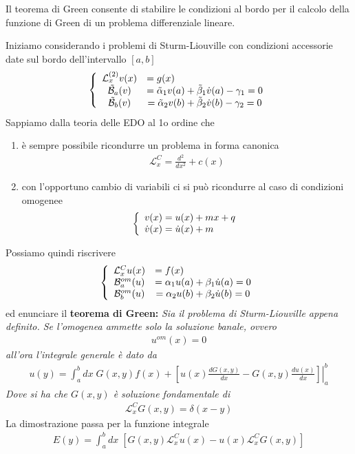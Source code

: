 Il teorema di Green consente di stabilire le condizioni al bordo per il calcolo della funzione di Green di un problema differenziale lineare.

Iniziamo considerando i problemi di Sturm-Liouville con condizioni accessorie date sul bordo dell'intervallo $[a,b]$
\begin{align}
	\triple{\mathcal{L}_x^{(2)} v(x) &= g(x) \hfill}{\mathcal{\tilde{B}}_a(v) &= \tilde{\alpha}_1 v(a) + \tilde{\beta}_1 \dot{v}(a) - \gamma_1 = 0}{\mathcal{\tilde{B}}_b(v) &= \tilde{\alpha}_2 v(b) + \tilde{\beta}_2 \dot{v}(b) - \gamma_2 = 0}
\end{align}
Sappiamo dalla teoria delle EDO al 1o ordine che 
\begin{enumerate}
	\item è sempre possibile ricondurre un problema in forma canonica
	\begin{align}
		\mathcal{L}_x^{C} = \frac{d^2}{dx^2} + c(x) \label{omcond3}
	\end{align} 
	\item con l'opportuno cambio di variabili ci si può ricondurre al caso di condizioni omogenee
		\begin{align}
			\double{v(x) = u(x)+ mx + q}{\dot{v}(x) = \dot{u}(x) +m \hfill}			
		\end{align}
\end{enumerate}
Possiamo quindi riscrivere
\begin{align}
	\triple{\mathcal{L}_x^{C} u(x) &= f(x) \hfill}{\mathcal{B}^{om}_a(u) &= \alpha_1 u(a) + \beta_1 \dot{u}(a) = 0}{\mathcal{B}^{om}_b(u) &= \alpha_2 u(b) + \beta_2 \dot{u}(b) = 0} \label{omcond1}
\end{align}
ed enunciare il \textbf{teorema di Green:} \textit{Sia il problema di Sturm-Liouville appena definito. Se l'omogenea ammette solo la soluzione banale, ovvero
\begin{align}
	u^{om}(x) = 0
\end{align}
all'ora l'integrale generale è dato da
\begin{align}
	u(y) = \int_{a}^{b} dx \; G(x,y) f(x) + \left.\left[ u(x) \frac{dG(x,y)}{dx} - G(x,y) \frac{du(x)}{dx} \right]\right|_a^b
\end{align}
Dove si ha che $G(x,y)$ è soluzione fondamentale di
\begin{align}
	\mathcal{L}_x^{C} G(x,y) = \delta(x-y) \label{omcond2}
\end{align}
}
La dimostrazione passa per la funzione integrale
\begin{align}
	E(y) = \int_{a}^{b} dx \; [G(x,y) \mathcal{L}_x^{C} u(x) - u(x)  \mathcal{L}_x^{C} G(x,y)]
\end{align}
